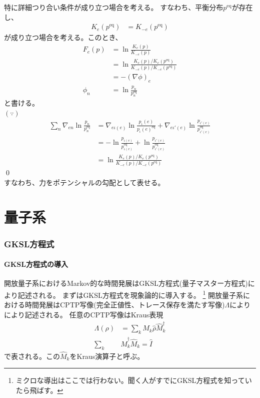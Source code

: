 \documentclass[a4paper,11pt]{jsarticle}
\numberwithin{equation}{section}
\begin{document}
特に詳細つり合い条件が成り立つ場合を考える。
すなわち、平衡分布$p^{\mathrm{eq}}$が存在し、
\begin{align}
    K_{e}(p^{\mathrm{eq}}) &= K_{-e}(p^{\mathrm{eq}}) 
\end{align}
が成り立つ場合を考える。このとき、
\begin{align}
    F_{e}(p) &= \ln \frac{K_{e}(p)}{K_{-e}(p)} \\
    &= \ln \frac{K_{e}(p)/K_{e}(p^{\mathrm{eq}})}{K_{-e}(p)/K_{-e}(p^{\mathrm{eq}})} \\
    &= -(\nabla \phi)_{e} \label{eq:potential}\\
    \phi_{n} &= \ln \frac{p_{n}}{p_{n}^{\mathrm{eq}}} 
\end{align}
と書ける。\\
$(\because)$
    \begin{align}
        \sum_{n} \nabla_{en} \ln\frac{p_n}{p_n^{\text{eq}}}
        &= \nabla_{e\iota(e)} \ln\frac{p_\iota(e)}{p_\iota(e)^{\text{eq}}}
        +\nabla_{e\iota'(e)} \ln\frac{p_{\iota'(e)}}{p_{\iota'(e)}^{\text{eq}}}\\
        &= - \ln\frac{p_{\iota(e)}}{p_{\iota(e)}^{\text{eq}}}
        + \ln\frac{p_{\iota'(e)}}{p_{\iota'(e)}^{\text{eq}}}\\
        &= \ln \frac{K_{e}(p)/K_{e}(p^{\mathrm{eq}})}{K_{-e}(p)/K_{-e}(p^{\mathrm{eq}})}
    \end{align}
\qed\\
すなわち、力をポテンシャルの勾配として表せる。

\newpage
\part{量子系}
\section{GKSL方程式}
\subsection{GKSL方程式の導入}
開放量子系におけるMarkov的な時間発展はGKSL方程式(量子マスター方程式)により記述される。
まずはGKSL方程式を現象論的に導入する。
\footnote{
    ミクロな導出はここでは行わない。聞く人がすでにGKSL方程式を知っていたら飛ばす。
}
開放量子系における時間発展はCPTP写像(完全正値性、トレース保存を満たす写像)$\Lambda$によりにより記述される。
任意のCPTP写像はKraus表現
\begin{align}
    \Lambda(\rho) &= \sum_{k} \hat{M}_{k} \hat{\rho} \hat{M}_{k}^\dagger\\
    \sum_{k} &\hat{M}_{k}^\dagger \hat{M}_{k} = \hat{I}
\end{align}
で表される。この$\hat{M}_{k}$をKraus演算子と呼ぶ。
\end{document}
